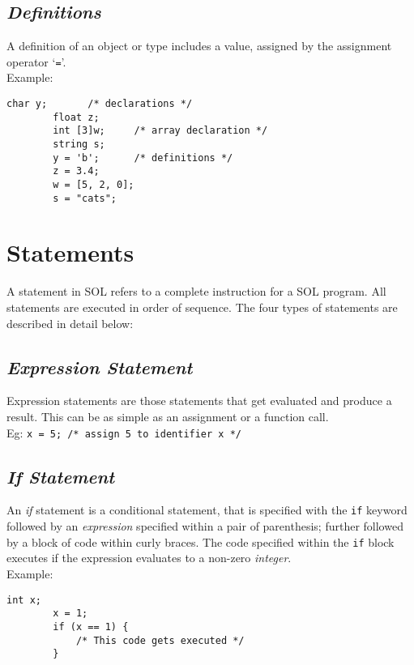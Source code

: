 \documentclass[letterpaper,12pt]{article}
\begin{document}
    \subsection{\textit{Definitions}}
    A definition of an object or type includes a value, assigned by the assignment operator `\texttt{=}'.\\
    Example:\\
    \begin{lstlisting}[style=sol]
        char y;       /* declarations */
        float z;
        int [3]w;     /* array declaration */
        string s;
        y = 'b';      /* definitions */
        z = 3.4;
        w = [5, 2, 0];
        s = "cats";
    \end{lstlisting}

\section{Statements} \label{classes}
A statement in SOL refers to a complete instruction for a SOL program. All statements are executed in order of sequence. The four types of statements are described in detail below:\\

    \subsection{\textit{Expression Statement}}
    Expression statements are those statements that get evaluated and produce a result. This can be as simple as an assignment or a function call.\\
    Eg: \texttt{x = 5; /* assign 5 to identifier x */}

    \subsection{\textit{If Statement}}
    An \textit{if} statement is a conditional statement, that is specified with the \texttt{if} keyword followed by an \textit{expression} specified within a pair of parenthesis; further followed by a block of code within curly braces. The code specified within the \texttt{if} block executes if the expression evaluates to a non-zero \textit{integer}.\\
    Example:\\
    \begin{lstlisting}[style=sol]
        int x;
        x = 1;
        if (x == 1) {
            /* This code gets executed */
        }
    \end{lstlisting}
\end{document}
